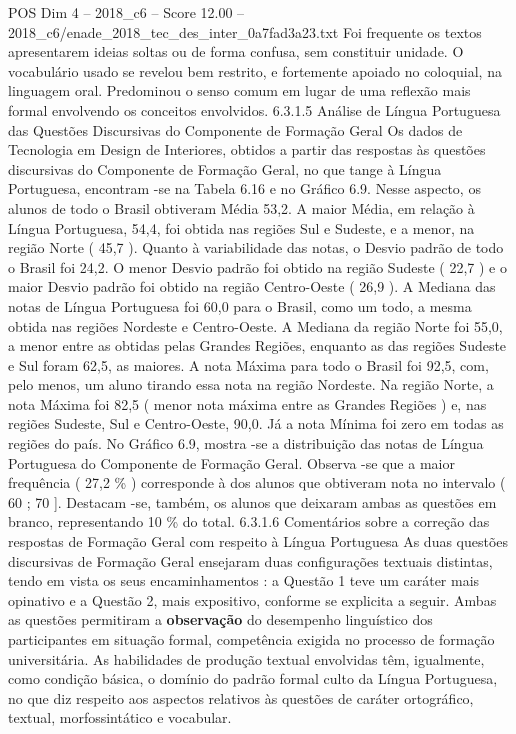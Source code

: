 \begin{textsample}{POS Dim 4 – 2018\_c6 – Score 12.00 – 2018\_c6/enade\_2018\_tec\_des\_inter\_0a7fad3a23.txt}
Foi frequente os textos apresentarem ideias soltas ou de forma confusa, sem constituir unidade.
O vocabulário usado se revelou bem restrito, e fortemente apoiado no coloquial, na linguagem oral.
Predominou o senso comum em lugar de uma reflexão mais formal envolvendo os conceitos envolvidos. 6.3.1.5 Análise de Língua Portuguesa das Questões Discursivas do Componente de Formação Geral Os dados de Tecnologia em Design de Interiores, obtidos a partir das respostas às questões discursivas do Componente de Formação Geral, no que tange à Língua Portuguesa, encontram -se na Tabela 6.16 e no Gráfico 6.9.
Nesse aspecto, os alunos de todo o Brasil obtiveram Média 53,2.
A maior Média, em relação à Língua Portuguesa, 54,4, foi obtida nas regiões Sul e Sudeste, e a menor, na região Norte ( 45,7 ).
Quanto à variabilidade das notas, o Desvio padrão de todo o Brasil foi 24,2.
O menor Desvio padrão foi obtido na região Sudeste ( 22,7 ) e o maior Desvio padrão foi obtido na região Centro-Oeste ( 26,9 ).
A Mediana das notas de Língua Portuguesa foi 60,0 para o Brasil, como um todo, a mesma obtida nas regiões Nordeste e Centro-Oeste.
A Mediana da região Norte foi 55,0, a menor entre as obtidas pelas Grandes Regiões, enquanto as das regiões Sudeste e Sul foram 62,5, as maiores.
A nota Máxima para todo o Brasil foi 92,5, com, pelo menos, um aluno tirando essa nota na região Nordeste.
Na região Norte, a nota Máxima foi 82,5 ( menor nota máxima entre as Grandes Regiões ) e, nas regiões Sudeste, Sul e Centro-Oeste, 90,0.
Já a nota Mínima foi zero em todas as regiões do país.
No Gráfico 6.9, mostra -se a distribuição das notas de Língua Portuguesa do Componente de Formação Geral.
Observa -se que a maior frequência ( 27,2 \% ) corresponde à dos alunos que obtiveram nota no intervalo ( 60 ; 70 ].
Destacam -se, também, os alunos que deixaram ambas as questões em branco, representando 10 \% do total. 6.3.1.6 Comentários sobre a correção das respostas de Formação Geral com respeito à Língua Portuguesa As duas questões discursivas de Formação Geral ensejaram duas configurações textuais distintas, tendo em vista os seus encaminhamentos : a Questão 1 teve um caráter mais opinativo e a Questão 2, mais expositivo, conforme se explicita a seguir.
Ambas as questões permitiram a \textbf{observação} do desempenho linguístico dos participantes em situação formal, competência exigida no processo de formação universitária.
As habilidades de produção textual envolvidas têm, igualmente, como condição básica, o domínio do padrão formal culto da Língua Portuguesa, no que diz respeito aos aspectos relativos às questões de caráter ortográfico, textual, morfossintático e vocabular.

\end{textsample}
